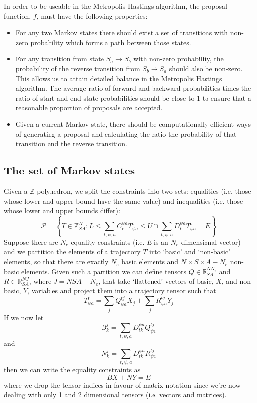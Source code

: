 \documentclass{article}
\begin{document}
In order to be useable in the Metropolis-Hastings algorithm, the proposal function, $f$, must have the following properties:
\begin{itemize}
	\item For any two Markov states there should exist a set of transitions with non-zero probability which forms a path between those states.
	
	\item For any transition from state $S_a \to S_b$ with non-zero probability, the probability of the reverse transition from $S_b \to S_a$ should also be non-zero. This allows us to attain detailed balance in the Metropolis Hastings algorithm. The average ratio of forward and backward probabilities times the ratio of start and end state probabilities should be close to 1 to ensure that a reasonable proportion of proposals are accepted.
	
	\item Given a current Markov state, there should be computationally efficient ways of generating a proposal and calculating the ratio the probability of that transition and the reverse transition. 
\end{itemize}


\subsection{The set of Markov states}

Given a $\mathbb{Z}$-polyhedron, we split the constraints into two sets: equalities (i.e. those whose lower and upper bound have the same value) and inequalities (i.e. those whose lower and upper bounds differ):
\begin{equation}
\mathcal{P} = \left\{T \in \mathbb{Z}^N_{SA}: L \le \sum_{t,\psi,a} C^{\psi a}_t T^t_{\psi a} \le U \cap \sum_{t,\psi,a} D^{\psi a}_t T^t_{\psi a} = E \right\}
\label{bPolySupport}
\end{equation}
Suppose there are $N_e$ equality constraints (i.e. $E$ is an $N_e$ dimensional vector) and we partition the elements of a trajectory $T$ into `basic' and `non-basic' elements, so that there are exactly $N_e$ basic elements and $N\times S \times A - N_e$ non-basic elements. Given such a partition we can define tensors $Q\in\mathbb{R}_{SA}^{NN_e}$ and $R\in\mathbb{R}_{SA}^{NJ}$, where $J=NSA - N_e$, that take `flattened' vectors of basic, $X$, and non-basic, $Y$, variables and project them into a trajectory tensor such that
\[
T^t_{\psi a} =  \sum_{j}Q_{\psi a}^{tj} X_j + \sum_{j}R_{\psi a}^{t j} Y_j
\]
If we now let
\[
B^j_k = \sum_{t,\psi,a} D^{\psi a}_{tk}Q_{\psi a}^{tj}
\]
and
\[
N^j_k = \sum_{t,\psi,a} D^{\psi a}_{tk}R_{\psi a}^{tj}
\]
then we can write the equality constraints as
\[
BX + NY = E
\]
where we drop the tensor indices in favour of matrix notation since we're now dealing with only 1 and 2 dimensional tensors (i.e. vectors and matrices).
\end{document}
